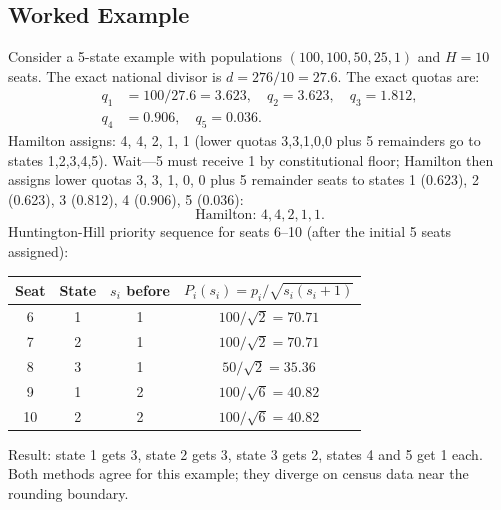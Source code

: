 \subsection{Worked Example}

Consider a 5-state example with populations $(100, 100, 50, 25, 1)$
and $H = 10$ seats.
The exact national divisor is $d = 276/10 = 27.6$.
The exact quotas are:
\begin{align*}
q_1 &= 100/27.6 = 3.623, \quad q_2 = 3.623, \quad q_3 = 1.812, \\
q_4 &= 0.906, \quad q_5 = 0.036.
\end{align*}
Hamilton assigns: 4, 4, 2, 1, 1 (lower quotas 3,3,1,0,0 plus 5 remainders go to states 1,2,3,4,5).
Wait---5 must receive 1 by constitutional floor; Hamilton then assigns
lower quotas 3, 3, 1, 0, 0 plus 5 remainder seats to states 1 (0.623),
2 (0.623), 3 (0.812), 4 (0.906), 5 (0.036):
\[
\text{Hamilton: } 4, 4, 2, 1, 1.
\]
Huntington-Hill priority sequence for seats 6--10 (after the initial
5 seats assigned):
\begin{center}
\begin{tabular}{cccc}
\toprule
Seat & State & $s_i$ before & $P_i(s_i) = p_i/\sqrt{s_i(s_i+1)}$ \\
\midrule
6 & 1 & 1 & $100/\sqrt{2} = 70.71$ \\
7 & 2 & 1 & $100/\sqrt{2} = 70.71$ \\
8 & 3 & 1 & $50/\sqrt{2} = 35.36$ \\
9 & 1 & 2 & $100/\sqrt{6} = 40.82$ \\
10 & 2 & 2 & $100/\sqrt{6} = 40.82$ \\
\bottomrule
\end{tabular}
\end{center}
Result: state 1 gets 3, state 2 gets 3, state 3 gets 2, states 4 and 5
get 1 each.
Both methods agree for this example; they diverge on census data
near the rounding boundary.
